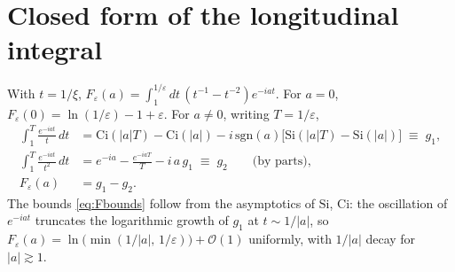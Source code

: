 \documentclass[11pt]{article}
\begin{document}
\appendix

\section{Closed form of the longitudinal integral}
\label{app:F}

With $t=1/\xi$,
$F_\varepsilon(a)=\int_{1}^{1/\varepsilon}dt\,(t^{-1}-t^{-2})e^{-iat}$.
For $a=0$, $F_\varepsilon(0)=\ln(1/\varepsilon)-1+\varepsilon$.  For
$a\neq0$, writing $T=1/\varepsilon$,
\begin{align}
\int_1^T\frac{e^{-iat}}{t}\,dt
&=\mathrm{Ci}(|a|T)-\mathrm{Ci}(|a|)
-i\,\mathrm{sgn}(a)\big[\mathrm{Si}(|a|T)-\mathrm{Si}(|a|)\big]
\;\equiv\;g_1,\\
\int_1^T\frac{e^{-iat}}{t^{2}}\,dt
&=e^{-ia}-\frac{e^{-iaT}}{T}-i\,a\,g_1\;\equiv\;g_2
\qquad\text{(by parts)},\\
F_\varepsilon(a)&=g_1-g_2 .
\end{align}
The bounds \eqref{eq:Fbounds} follow from the asymptotics of
$\mathrm{Si}$, $\mathrm{Ci}$: the oscillation of $e^{-iat}$ truncates
the logarithmic growth of $g_1$ at $t\sim1/|a|$, so
$F_\varepsilon(a)=\ln\big(\min(1/|a|,\,1/\varepsilon)\big)+\mathcal O(1)$
uniformly, with $1/|a|$ decay for $|a|\gtrsim1$.
\end{document}
